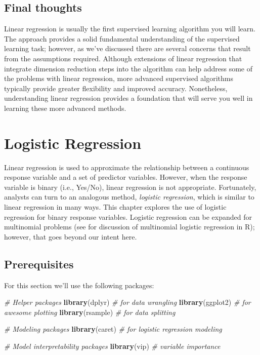 \documentclass[]{krantz}
\makeatletter
\newenvironment{Shaded}{\begin{snugshade}}{\end{snugshade}}
\newcommand{\CommentTok}[1]{\textcolor[rgb]{0.37,0.37,0.37}{\textit{#1}}}
\newcommand{\KeywordTok}[1]{\textcolor[rgb]{0.27,0.27,0.27}{\textbf{#1}}}
\newcommand{\NormalTok}[1]{#1}
\newenvironment{kframe}{%
\medskip{}
\setlength{\fboxsep}{.8em}
 \def\at@end@of@kframe{}%
 \ifinner\ifhmode%
  \def\at@end@of@kframe{\end{minipage}}%
  \begin{minipage}{\columnwidth}%
 \fi\fi%
 \def\FrameCommand##1{\hskip\@totalleftmargin \hskip-\fboxsep
 \colorbox{shadecolor}{##1}\hskip-\fboxsep
     \hskip-\linewidth \hskip-\@totalleftmargin \hskip\columnwidth}%
 \MakeFramed {\advance\hsize-\width
   \@totalleftmargin\z@ \linewidth\hsize
   \@setminipage}}%
 {\par\unskip\endMakeFramed%
 \at@end@of@kframe}
\renewenvironment{Shaded}{\begin{kframe}}{\end{kframe}}
\makeatother
\begin{document}
\hypertarget{final-thoughts}{%
\section{Final thoughts}\label{final-thoughts}}

Linear regression is usually the first supervised learning algorithm you will learn. The approach provides a solid fundamental understanding of the supervised learning task; however, as we've discussed there are several concerns that result from the assumptions required. Although extensions of linear regression that integrate dimension reduction steps into the algorithm can help address some of the problems with linear regression, more advanced supervised algorithms typically provide greater flexibility and improved accuracy. Nonetheless, understanding linear regression provides a foundation that will serve you well in learning these more advanced methods.

\hypertarget{logistic-regression}{%
\chapter{Logistic Regression}\label{logistic-regression}}

Linear regression is used to approximate the relationship between a continuous response variable and a set of predictor variables. However, when the response variable is binary (i.e., Yes/No), linear regression is not appropriate. Fortunately, analysts can turn to an analogous method, \emph{logistic regression}, which is similar to linear regression in many ways. This chapter explores the use of logistic regression for binary response variables. Logistic regression can be expanded for multinomial problems (see \citet{faraway2016extending} for discussion of multinomial logistic regression in R); however, that goes beyond our intent here.

\hypertarget{prerequisites-3}{%
\section{Prerequisites}\label{prerequisites-3}}

For this section we'll use the following packages:

\begin{Shaded}
\begin{Highlighting}[]
\CommentTok{# Helper packages}
\KeywordTok{library}\NormalTok{(dplyr)     }\CommentTok{# for data wrangling}
\KeywordTok{library}\NormalTok{(ggplot2)   }\CommentTok{# for awesome plotting}
\KeywordTok{library}\NormalTok{(rsample)   }\CommentTok{# for data splitting}

\CommentTok{# Modeling packages}
\KeywordTok{library}\NormalTok{(caret)     }\CommentTok{# for logistic regression modeling}

\CommentTok{# Model interpretability packages}
\KeywordTok{library}\NormalTok{(vip)       }\CommentTok{# variable importance}
\end{Highlighting}
\end{Shaded}
\end{document}
